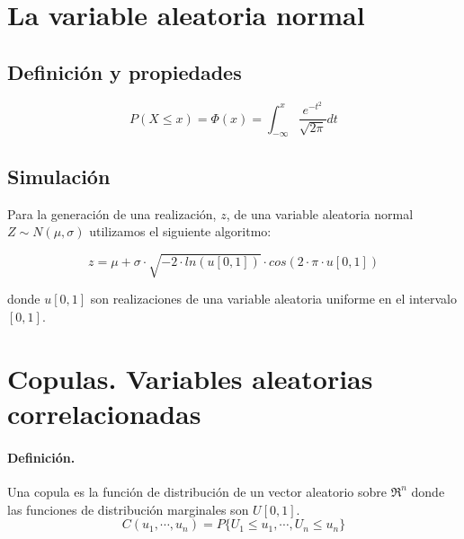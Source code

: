 
\section{La variable aleatoria normal}

\subsection{Definici\'on y propiedades}

\begin{displaymath}
P(X \leq x) = \Phi(x) = \int_{-\infty}^{x} \frac{e^{-t^2}}{\sqrt{2 \pi}} dt
\end{displaymath}

\subsection{Simulaci\'on}

Para la generación de una realización, $z$, de una variable aleatoria normal  
$Z \sim N(\mu, \sigma)$ utilizamos el siguiente algoritmo:

\begin{displaymath}
z = \mu + \sigma\cdot \sqrt{-2 \cdot ln(u[0,1])} \cdot cos(2 \cdot \pi \cdot u[0,1])
\end{displaymath}

\noindent donde $u[0,1]$ son realizaciones de una variable aleatoria uniforme 
en el intervalo $[0,1]$.


\section{Copulas. Variables aleatorias correlacionadas}

\paragraph{Definici\'on.}
Una copula es la funci\'on de distribuci\'on de un vector aleatorio sobre 
$\Re^n$ donde las funciones de distribuci\'on marginales son $U[0,1]$. 
\begin{displaymath}
C(u_1, \cdots, u_n) = P\{U_1 \leq u_1, \cdots, U_n \leq u_n\}
\end{displaymath}

